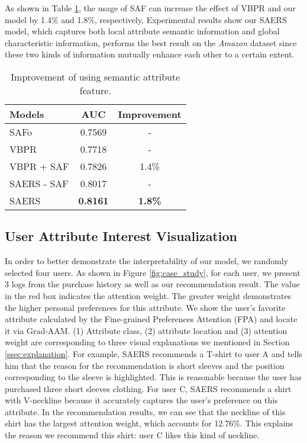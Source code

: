 \documentclass{article}
\begin{document}
As shown in Table \ref{table:attribute}, the usage of SAF can increase the effect of VBPR and our model by 1.4\% and 1.8\%, respectively. Experimental results show our SAERS model, which captures both local attribute semantic information and global characteristic information, performs the best result on the \textit{Amazon} dataset since these two kinds of information mutually enhance each other to a certain extent. 
\begin{table}[]
\begin{center}
\begin{tabular}{lcc}
\hline
Models     & AUC             & \multicolumn{1}{l}{Improvement} \\ \hline
SAFo       & 0.7569          & -                            \\
\hline
VBPR       & 0.7718          & -                               \\
VBPR + SAF & 0.7826          & 1.4\%                          \\ \hline
SAERS - SAF & 0.8017          & -                               \\
SAERS       & \textbf{0.8161} & \textbf{1.8\%}                  \\ \hline
\end{tabular}
\end{center}
\caption{Improvement of using semantic attribute feature.}\bigskip
\label{table:attribute}\end{table}

\subsection{User Attribute Interest Visualization}
In order to better demonstrate the interpretability of our model, we randomly selected four users. As shown in Figure \ref{fig:case_study}, for each user, we present 3 logs from the purchase history as well as our recommendation result. The value in the red box indicates the attention weight. The greater weight demonstrates the higher personal preferences for this attribute. We show the user's favorite attribute calculated by the Fine-grained Preferences Attention (FPA) and locate it via Grad-AAM.
(1) Attribute class, (2) attribute location and (3) attention weight are corresponding to three visual explanations we mentioned in Section \ref{ssec:explanation}.
For example, SAERS recommends a T-shirt to user A and tells him that the reason for the recommendation is short sleeves and the position corresponding to the sleeve is highlighted. This is reasonable because the user has purchased three short sleeves clothing. For user C, SAERS recommends a shirt with V-neckline because it accurately captures the user's preference on this attribute. In the recommendation results, we can see that the neckline of this shirt has the largest attention weight, which accounts for 12.76\%. This explains the reason we recommend this shirt: user C likes this kind of neckline.
\end{document}

